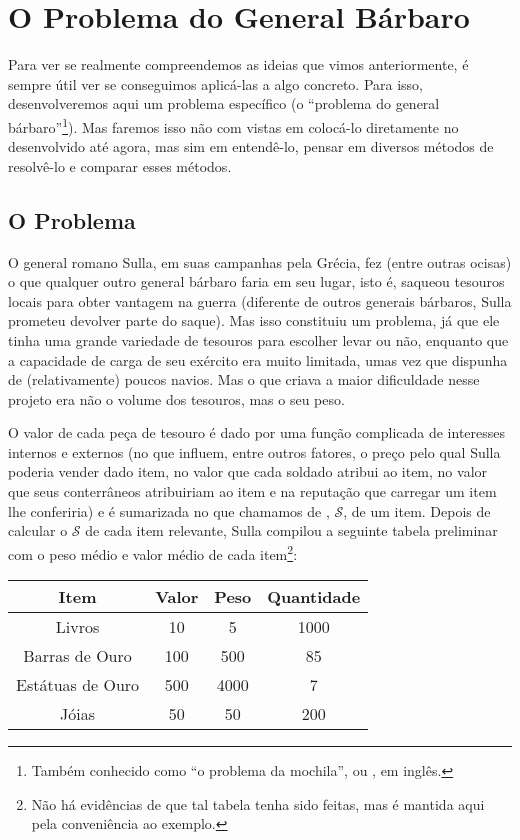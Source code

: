 \documentclass{article}
\begin{document}
\section{O Problema do General Bárbaro}

  Para ver se realmente compreendemos as ideias que vimos anteriormente, é sempre útil ver se
  conseguimos aplicá-las a algo concreto. Para isso, desenvolveremos aqui um problema específico (o
  ``problema do general bárbaro''\footnote{Também conhecido como ``o problema da mochila'', ou
  , em inglês.}). Mas faremos isso não com vistas em colocá-lo diretamente no
 desenvolvido até agora, mas sim em entendê-lo, pensar em diversos métodos de
resolvê-lo e comparar esses métodos.

\subsection{O Problema}

O general romano Sulla, em suas campanhas pela Grécia, fez (entre outras ocisas) o que qualquer
outro general bárbaro faria em seu lugar, isto é, saqueou tesouros locais para obter vantagem na
guerra (diferente de outros
generais bárbaros, Sulla prometeu devolver parte do saque). Mas isso constituiu um problema,
já que ele tinha uma grande variedade de tesouros para escolher levar ou não, enquanto que a
capacidade de carga de seu exército era muito limitada, umas vez que dispunha de
(relativamente) poucos navios. Mas o que criava a maior dificuldade nesse projeto era não o volume
dos tesouros, mas o seu peso.

O valor de cada peça de tesouro é dado por uma função complicada de interesses internos e externos
(no que influem, entre outros fatores, o preço pelo qual Sulla poderia vender dado item, no valor que cada
soldado atribui ao item, no valor que seus conterrâneos atribuiriam ao item e na reputação que
carregar um item lhe conferiria) e
é sumarizada no que chamamos de , $\mathscr{S}$, de um item. Depois de calcular
o $\mathscr{S}$ de cada item relevante, Sulla compilou a seguinte tabela preliminar com o peso médio e valor
médio de cada item\footnote{Não há evidências de que tal tabela tenha sido feitas, mas é mantida
  aqui pela conveniência ao exemplo.}:


\begin{center}
  \begin{tabular}{c|c|c|c}
    Item              & Valor  & Peso  & Quantidade\\
    \hline
    Livros            & 10     & 5     & 1000 \\
    Barras de Ouro    & 100    & 500   & 85 \\
    Estátuas de Ouro  & 500    & 4000  & 7 \\
    Jóias             & 50     & 50    & 200 \\
  \end{tabular}
\end{center}
\end{document}
